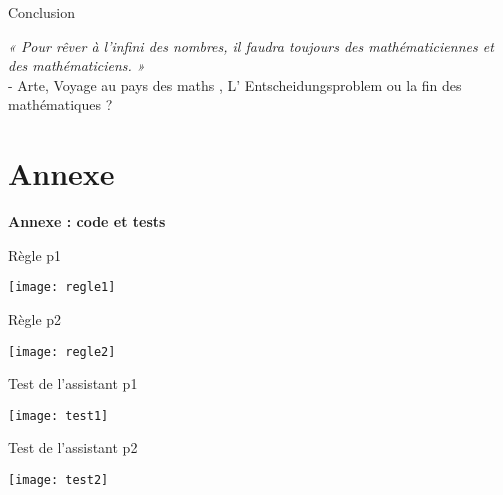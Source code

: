 \documentclass{beamer}
\begin{document}
\begin{frame}{Conclusion}
    \begin{flushright}
        \textit{« Pour rêver à l'infini des nombres, il faudra toujours des mathématiciennes et des mathématiciens. »}\\
         \vspace{1cm}
        \small{- Arte, Voyage au pays des maths , L' Entscheidungsproblem ou la fin des mathématiques ?}
    \end{flushright}
\end{frame}


\section{Annexe}

\appendix



\begin{frame}
  \centering
  \vfill
  {\LARGE \textbf{Annexe : code et tests}}
  \vfill
\end{frame}


\begin{frame}{Règle p1}
    \begin{minipage}{0.95\textwidth}
        \centering
        \texttt{[image: regle1]}
    \end{minipage} 
    
\end{frame}

\begin{frame}{Règle p2}
    \begin{minipage}{0.95\textwidth}
        \centering
        \texttt{[image: regle2]}
    \end{minipage} 
    
\end{frame}


\begin{frame}{Test de l'assistant p1}
    \begin{minipage}{0.95\textwidth}
        \centering
        \texttt{[image: test1]}
    \end{minipage} 
    
\end{frame}


\begin{frame}{Test de l'assistant p2}
    \begin{minipage}{0.95\textwidth}
        \centering
        \texttt{[image: test2]}
    \end{minipage} 
    
\end{frame}
\end{document}
